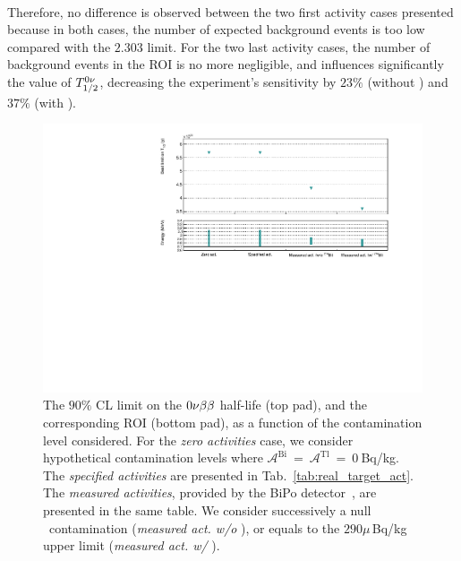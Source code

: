 \paragraph{}
Therefore, no difference is observed between the two first activity cases presented because in both cases, the number of expected background events is too low compared with the $2.303$ limit.
For the two last activity cases, the number of background events in the ROI is no more negligible, and influences significantly the value of $T_{1/2}^{0\nu}$, decreasing the experiment's sensitivity by $23\%$ (without \Bi) and $37\%$ (with \Bi).
\begin{figure}[h!]
  \centering
  \includegraphics[width=1.1\textwidth]{Sensitivity/fig_sensitivity/contamination_level_Se_B.pdf}
  \caption{The $90\%$ CL limit on the $0\nu\beta\beta$ half-life (top pad), and the corresponding ROI (bottom pad), as a function of the contamination level considered.
    For the \emph{zero activities} case, we consider hypothetical contamination levels where $\mathcal{A}^{\text{Bi}}~=~\mathcal{A}^{\text{Tl}}~=~0~$Bq/kg.
    The \emph{specified activities} are presented in Tab.~\ref{tab:real_target_act}.
    The \emph{measured activities}, provided by the BiPo detector~\cite{internal:bipo}, are presented in the same table.
    We consider successively a null \Bi\ contamination (\emph{measured act. w/o \Bi}), or equals to the $290\mu\,$Bq/kg upper limit (\emph{measured act. w/ \Bi}).
    \label{fig:real_target_act}}
\end{figure}

